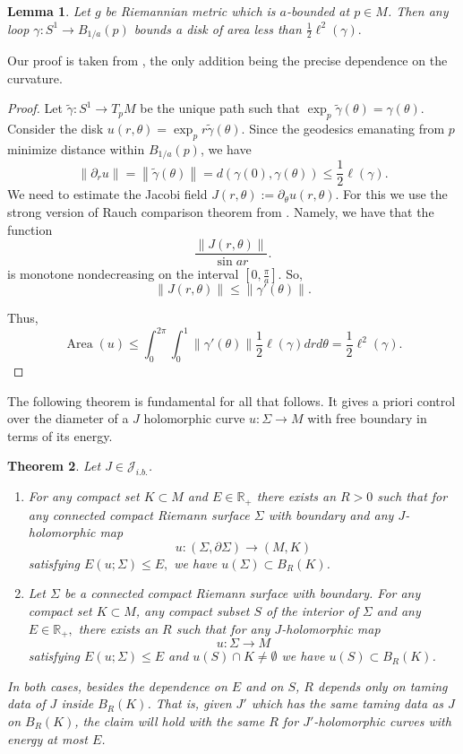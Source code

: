 \documentclass[11pt]{amsart}
\newcommand{\R}{\mathbb{R}}
\DeclareMathOperator{\area}{Area}
\newtheorem{tm}{Theorem}[section]
\newtheorem{lm}[tm]{Lemma}
\theoremstyle{definition}
\theoremstyle{remark}
\begin{document}
\begin{lm}\label{lmIsopCurv}
Let $g$ be Riemannian metric which is $a$-bounded at $p\in M$. Then any loop $\gamma:S^1\to B_{1/a}(p)$ bounds a disk of area less than $\frac12\ell^2(\gamma).$
\end{lm}
Our proof is taken from \cite{MS2}, the only addition being the precise dependence on the curvature.
\begin{proof}
Let $\tilde{\gamma}:S^1 \to T_pM$ be the unique path such that $\exp_p\tilde{\gamma}(\theta)=\gamma(\theta)$. Consider the disk $u(r,\theta)=\exp_pr\tilde{\gamma}(\theta)$. Since the geodesics emanating from $p$ minimize distance within $B_{1/a}(p)$, we have
\[
\|\partial_ru\|=\left\|\tilde{\gamma}(\theta)\right\|= d(\gamma(0),\gamma(\theta))\leq\frac12\ell(\gamma).
\]
We need to estimate the Jacobi field $J(r,\theta):=\partial_\theta u(r,\theta)$. For this we use the strong version of Rauch comparison theorem from \cite{Karcher}. Namely, we have that the function
\[
\frac{\|J(r,\theta)\|}{\sin ar}.
\]
is monotone nondecreasing on the interval $[0,\frac{\pi}{a}]$. So,
\[
\|J(r,\theta)\|\leq\|\gamma'(\theta)\|.
\]

Thus,
\[
\area(u)\leq\int_0^{2\pi}\int_0^1\|\gamma'(\theta)\| \frac12\ell(\gamma)drd\theta=\frac12\ell^2(\gamma).
\]
\end{proof}

The following theorem is fundamental for all that follows. It gives a priori control over the diameter of a $J$ holomorphic curve $u: \Sigma\to M$ with free boundary in terms of its energy.
\begin{tm}\label{tmDiamEst}
Let $J\in \mathcal{J}_{i.b.}$.
\begin{enumerate}
\item\label{tmDiamEstc1} For any compact set $K\subset M$ and $E\in\R_+$ there exists an $R>0$ such that for any connected compact Riemann surface $\Sigma$ with boundary and any $J$-holomorphic map
\[
u:(\Sigma,\partial\Sigma)\to (M,K)
\]
satisfying $E(u;\Sigma)\leq E,$ we have $u(\Sigma)\subset B_R(K)$.
\item\label{tmDiamEstc2}
  Let $\Sigma$ be a connected compact Riemann surface with boundary. For any compact set $K\subset M$, any compact subset $S$ of the interior of $\Sigma$ and any $E\in\R_+,$ there exists an $R$ such that for any $J$-holomorphic map
\[
u:\Sigma\to M
\]
satisfying $E(u;\Sigma)\leq E$ and $u(S)\cap K\neq\emptyset$ we have $u(S)\subset B_R(K)$.

 \end{enumerate}
In both cases, besides the dependence on $E$ and on $S$, $R$ depends only on taming data of $J$ inside $B_R(K)$. That is, given $J'$ which has the same taming data as $J$ on $B_R(K)$, the claim will hold with the same $R$ for $J'$-holomorphic curves with energy at most $E$.
\end{tm}
\end{document}
